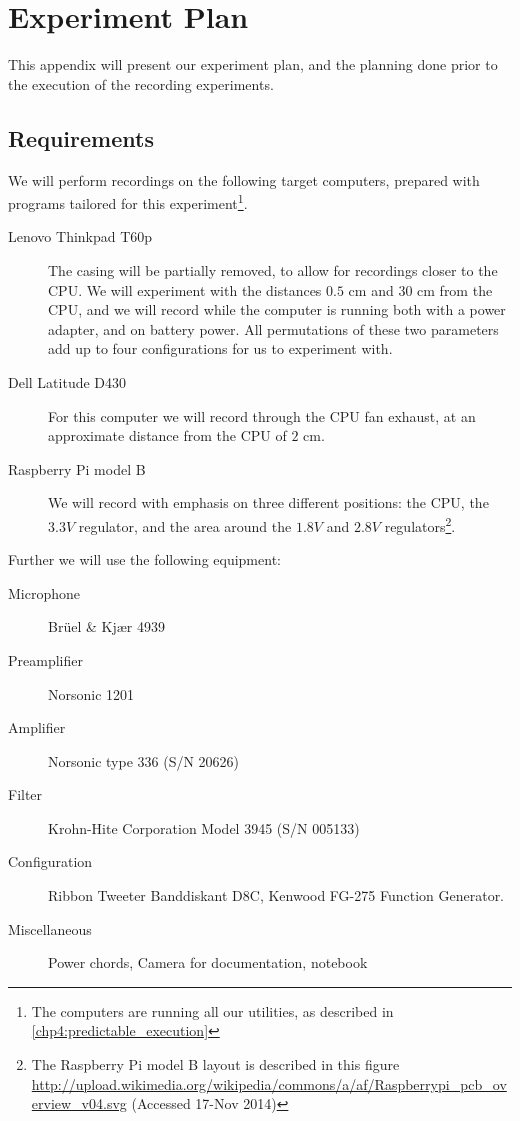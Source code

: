 \chapter{Experiment Plan}\label{apx:experiment_plan}
This appendix will present our experiment plan, and the planning done prior to the execution of the recording experiments.

\section{Requirements}

We will perform recordings on the following target computers, prepared with programs tailored for this experiment\footnote{The computers are running all our utilities, as described in \autoref{chp4:predictable_execution}}.
\begin{description}
	\item[Lenovo Thinkpad T60p] The casing will be partially removed, to allow for recordings closer to the CPU. We will experiment with the distances $0.5$ cm and $30$ cm from the CPU, and we will record while the computer is running both with a power adapter, and on battery power. All permutations of these two parameters add up to four configurations for us to experiment with.
	\item[Dell Latitude D430] For this computer we will record through the CPU fan exhaust, at an approximate distance from the CPU of $2$ cm.
	\item[Raspberry Pi model B] We will record with emphasis on three different positions: the CPU, the $3.3V$ regulator, and the area around the $1.8V$ and $2.8V$ regulators\footnote{The Raspberry Pi model B layout is described in this figure \url{http://upload.wikimedia.org/wikipedia/commons/a/af/Raspberrypi_pcb_overview_v04.svg} (Accessed 17-Nov 2014)}.
\end{description}

Further we will use the following equipment:
\begin{description}
	\item[Microphone] Brüel \& Kjær 4939
	\item[Preamplifier] Norsonic 1201
	\item[Amplifier] Norsonic type 336 (S/N 20626)
	\item[Filter] Krohn-Hite Corporation Model 3945 (S/N 005133)
	\item[Configuration] Ribbon Tweeter Banddiskant D8C, Kenwood FG-275 Function Generator.
	\item[Miscellaneous] Power chords, Camera for documentation, notebook
\end{description}


